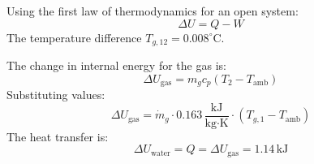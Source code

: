Using the first law of thermodynamics for an open system:  
\[
\Delta U = Q - W
\]  
The temperature difference \( T_{g,12} = 0.008^\circ\text{C} \).  

The change in internal energy for the gas is:  
\[
\Delta U_{\text{gas}} = m_g c_p (T_2 - T_{\text{amb}})
\]  
Substituting values:  
\[
\Delta U_{\text{gas}} = \dot{m}_g \cdot 0.163 \, \frac{\text{kJ}}{\text{kg·K}} \cdot (T_{g,1} - T_{\text{amb}})
\]  
The heat transfer is:  
\[
\Delta U_{\text{water}} = Q = \Delta U_{\text{gas}} = 1.14 \, \text{kJ}
\]
